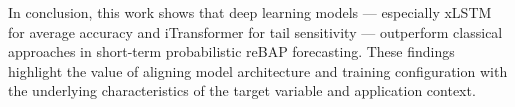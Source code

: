 \documentclass[class=scrbook, crop=false]{standalone}
\begin{document}
In conclusion, this work shows that deep learning models — especially xLSTM for average accuracy and iTransformer for tail sensitivity — outperform classical approaches in short-term probabilistic reBAP forecasting. These findings highlight the value of aligning model architecture and training configuration with the underlying characteristics of the target variable and application context.


%
%
%
%
%
\end{document}
